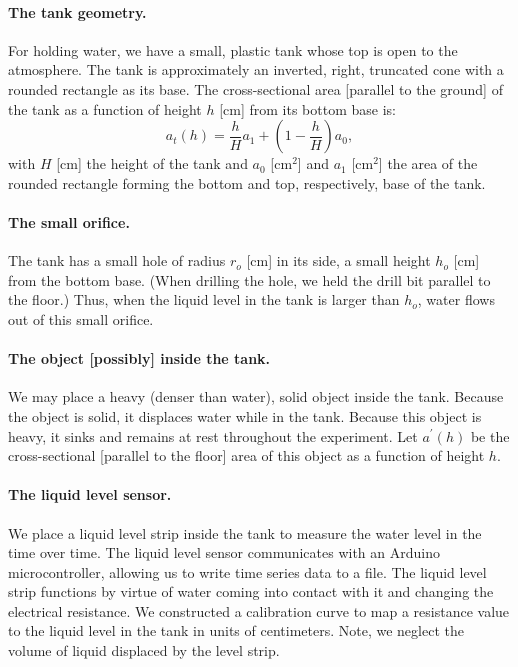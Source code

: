 \documentclass[openacc]{rsproca_new}%
\begin{document}
\paragraph{The tank geometry.} For holding water, we have a small, plastic tank whose top is open to the atmosphere. The tank is approximately an inverted, right, truncated cone with a rounded rectangle as its base. The cross-sectional area [parallel to the ground] of the tank as a function of height $h$ [cm] from its bottom base is:
\begin{equation}
a_t(h) = \frac{h}{H}a_1 + \left(1-\frac{h}{H}\right) a_0,
\end{equation}
with $H$ [cm] the height of the tank and $a_0$ [cm$^2$] and $a_1$ [cm$^2$] the area of the rounded rectangle forming the bottom and top, respectively, base of the tank.

\paragraph{The small orifice.} The tank has a small hole of radius $r_o$ [cm] in its side, a small height $h_o$ [cm] from the bottom base.
(When drilling the hole, we held the drill bit parallel to the floor.) Thus, when the liquid level in the tank is larger than $h_o$, water flows out of this small orifice.

\paragraph{The object [possibly] inside the tank.} We may place a heavy (denser than water), solid object inside the tank. Because the object is solid, it displaces water while in the tank. Because this object is heavy, it sinks and remains at rest throughout the experiment. Let $a^\prime(h)$ be the cross-sectional [parallel to the floor] area of this object as a function of height $h$.

\paragraph{The liquid level sensor.} We place a liquid level strip inside the tank to measure the water level in the time over time. The liquid level sensor communicates with an Arduino microcontroller, allowing us to write time series data to a file. The liquid level strip functions by virtue of water coming into contact with it and changing the electrical resistance. We constructed a calibration curve to map a resistance value to the liquid level in the tank in units of centimeters. 
Note, we neglect the volume of liquid displaced by the level strip.
\end{document}
